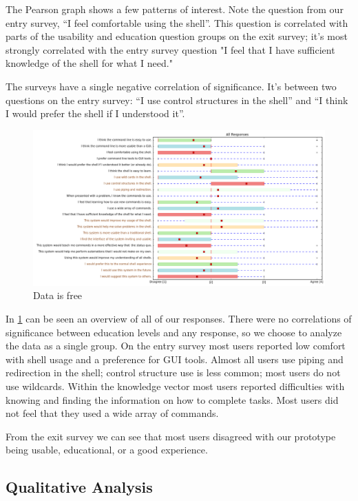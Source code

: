 The Pearson graph shows a few patterns of interest. Note the question from our
entry survey, ``I feel comfortable using the shell''. This question is
correlated with parts of the usability and education question groups on the exit
survey; it's most strongly correlated with the entry survey question "I feel
that I have sufficient knowledge of the shell for what I need."

The surveys have a single negative correlation of significance. It's between two
questions on the entry survey: ``I use control structures in the shell'' and ``I
think I would prefer the shell if I understood it''.

\begin{figure}[H]
  \centering
  \includegraphics[width=\textwidth]{figures/stats/all.png}
  \caption{Data is free}
  \label{fig:alldata}
\end{figure}

In \ref{fig:alldata} can be seen an overview of all of our responses. There were no
correlations of significance between education levels and any response, so we
choose to analyze the data as a single group. On the entry survey most users
reported low comfort with shell usage and a preference for GUI tools. Almost all
users use piping and redirection in the shell; control structure use is less
common; most users do not use wildcards. Within the knowledge vector most users
reported difficulties with knowing and finding the information on how to
complete tasks. Most users did not feel that they used a wide array of commands.

From the exit survey we can see that most users disagreed with our prototype
being usable, educational, or a good experience.

\subsection{Qualitative Analysis}

